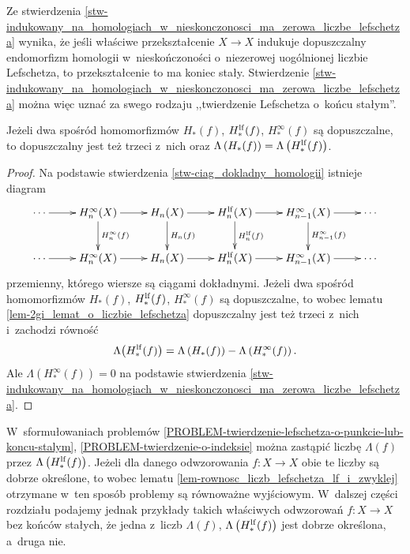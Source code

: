 Ze stwierdzenia \ref{stw-indukowany_na_homologiach_w_nieskonczonosci_ma_zerowa_liczbe_lefschetza} wynika, że jeśli właściwe przekształcenie $X\to X$ indukuje dopuszczalny endomorfizm homologii w~nieskończoności o~niezerowej uogólnionej liczbie Lefschetza, to przekształcenie to ma koniec stały.  Stwierdzenie \ref{stw-indukowany_na_homologiach_w_nieskonczonosci_ma_zerowa_liczbe_lefschetza} można więc uznać za swego rodzaju ,,twierdzenie \mbox{Lefschetza} o~końcu stałym''.

\begin{lem}\label{lem-rownosc_liczb_lefschetza_lf_i_zwyklej}
Jeżeli dwa spośród homomorfizmów $H_*(f)$, $H_*^{\mathrm{lf}}(f)$, $H_*^\infty(f)$ są dopuszczalne, to dopuszczalny jest też trzeci z~nich oraz $\Lambda\left(H_*(f)\right)=\Lambda\left(H_*^{\mathrm{lf}}(f)\right)$.
\end{lem}
\begin{proof}
Na podstawie stwierdzenia \ref{stw-ciag_dokladny_homologii}  istnieje diagram \[\xymatrix{\cdots\ar[r] & H_n^\infty(X)\ar[r]\ar[d]^{H_n^\infty(f)} & H_n(X)\ar[r]\ar[d]^{H_n(f)} & H_n^{\lf}(X)\ar[r]\ar[d]^{H_n^{\lf}(f)} & H_{n-1}^\infty(X)\ar[r]\ar[d]^{H_{n-1}^\infty(f)} & \cdots\\ 
\cdots\ar[r] & H_n^\infty(X)\ar[r] & H_n(X)\ar[r] & H_n^{\lf}(X)\ar[r] & H_{n-1}^\infty(X)\ar[r] & \cdots}\] przemienny, którego wiersze są ciągami dokładnymi. Jeżeli dwa spośród homomorfizmów $H_*(f)$, $H_*^{\mathrm{lf}}(f)$, $H_*^\infty(f)$ są dopuszczalne, to wobec lematu \ref{lem-2gi_lemat_o_liczbie_lefschetza} dopuszczalny jest też trzeci z~nich i~zachodzi równość \[\Lambda\bigl(H_*^{\mathrm{lf}}(f)\bigr)=\Lambda\left(H_*(f)\right)-\Lambda\left(H_*^{\infty}(f)\right).\] Ale $\Lambda\left(H_*^{\infty}(f)\right)=0$ na podstawie stwierdzenia \ref{stw-indukowany_na_homologiach_w_nieskonczonosci_ma_zerowa_liczbe_lefschetza}.
\end{proof}

W~sformułowaniach problemów \ref{PROBLEM-twierdzenie-lefschetza-o-punkcie-lub-koncu-stalym}, \ref{PROBLEM-twierdzenie-o-indeksie} można zastąpić liczbę $\Lambda(f)$ przez $\Lambda\left(H_*^{\mathrm{lf}}(f)\right)$. Jeżeli dla danego odwzorowania $f\colon X\to X$ obie te liczby są dobrze określone, to wobec lematu \ref{lem-rownosc_liczb_lefschetza_lf_i_zwyklej} otrzymane w~ten sposób problemy są równoważne wyjściowym. W~dalszej części rozdziału podajemy jednak przykłady takich właściwych odwzorowań $f\colon X\to X$ bez końców stałych, że jedna z~liczb $\Lambda(f)$, $\Lambda\left(H_*^{\mathrm{lf}}(f)\right)$ jest dobrze określona, a~druga nie.




